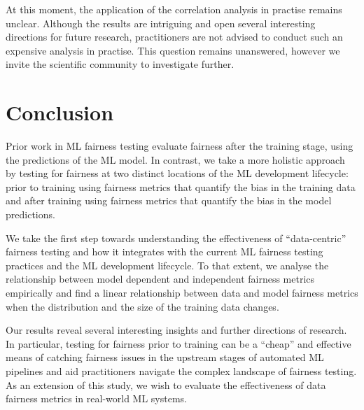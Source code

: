 \documentclass[sigconf,review,anonymous]{acmart}
\begin{document}

At this moment, the application of the correlation analysis in
practise remains unclear. Although the results are intriguing and open
several interesting directions for future research, practitioners are
not advised to conduct such an expensive analysis in practise. This
question remains unanswered, however we invite the scientific
community to investigate further.


\section{Conclusion}\label{sec:conclude}

Prior work in ML fairness testing evaluate fairness after the training
stage, using the predictions of the ML model. In contrast, we take a
more holistic approach by testing for fairness at two distinct
locations of the ML development lifecycle: prior to training using
fairness metrics that quantify the bias in the training data and after
training using fairness metrics that quantify the bias in the model
predictions.


We take the first step towards understanding the effectiveness of
``data-centric'' fairness testing and how it integrates with the
current ML fairness testing practices and the ML development
lifecycle. To that extent, we analyse the relationship between model
dependent and independent fairness metrics empirically and find a
linear relationship between data and model fairness metrics when the
distribution and the size of the training data changes.

Our results reveal several interesting insights and further directions
of research. In particular, testing for fairness prior to training can
be a ``cheap'' and effective means of catching fairness issues in the
upstream stages of automated ML pipelines and aid practitioners
navigate the complex landscape of fairness testing. As an extension of
this study, we wish to evaluate the effectiveness of data fairness
metrics in real-world ML systems.



\end{document}
